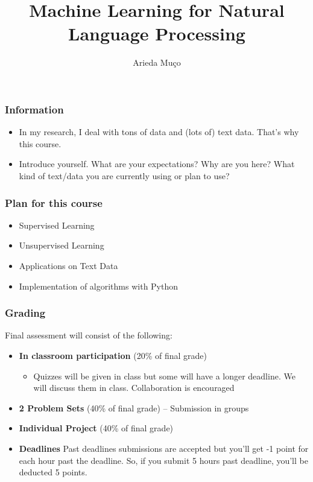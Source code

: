 \documentclass[compress, aspectratio=54]{beamer}
\title[Introduction]{Machine Learning for Natural Language Processing}
\author[Arieda Mu\c co]{Arieda Mu\c co}
\institute[CEU]{Central European University}
\date{}
\begin{document}
\captionsetup[subfigure]{labelformat=empty}

\frame{\titlepage}



\begin{frame}
\frametitle{Information}
\begin{itemize}
\item In my research, I deal with tons of data and (lots of) text data. That's why this course.
\item Introduce yourself. What are your expectations? Why are you here? What kind of text/data you are currently using or plan to use? 
\end{itemize}
\end{frame}

\begin{frame}
\frametitle{Plan for this course}
\begin{itemize}
\item Supervised Learning
\item Unsupervised Learning
\item Applications on Text Data

\item Implementation of algorithms with Python
\end{itemize}
\end{frame}






\begin{frame}
\frametitle{Grading}
Final assessment will consist of the following:
\begin{itemize}
\item \textbf{In classroom participation} (20\% of final grade)
\begin{itemize}
\item Quizzes will be given in class but some will have a longer deadline. We will discuss them in class.  Collaboration is encouraged
\end{itemize}

\item \textbf{2 Problem Sets} (40\% of final grade) -- Submission in groups
\item \textbf{Individual Project}  (40\% of final grade)

\item \textbf{Deadlines} Past deadlines submissions are accepted but you'll get  -1 point for each hour past the deadline. So, if you submit 5 hours past deadline, you'll be deducted 5 points. 

\end{itemize}
\end{frame}
\end{document}

